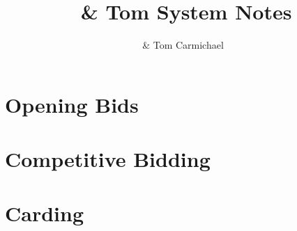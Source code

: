 
\frontmatter



\title{\partner~\& Tom System Notes}
\author{\partnerfull~\& Tom Carmichael}
\maketitle
\tableofcontents

\mainmatter


\part{Opening Bids}













\part{Competitive Bidding}



\part{Carding}

%
\backmatter
